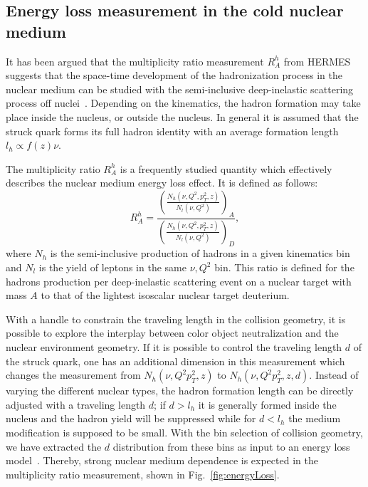 \subsection{Energy loss measurement in the cold nuclear medium}
It has been argued that the multiplicity ratio measurement $R^{h}_{A}$ from
HERMES suggests that the space-time development of the hadronization process in
the nuclear medium can be studied with the semi-inclusive deep-inelastic
scattering process off nuclei~\cite{Airapetian:2003mi,Airapetian:2007vu,Airapetian:2011jp}. Depending on the
kinematics, the hadron formation may take place inside the nucleus, or
outside the nucleus. In general it is assumed that the struck quark forms its
full hadron identity with an average formation length $l_{h}\propto f(z)\nu$.

The multiplicity ratio $R^{h}_{A}$ is a frequently studied quantity
which effectively describes the nuclear medium energy loss effect. It is defined as follows:
\begin{equation}
R^{h}_{A}=\frac{(\frac{N_{h}(\nu,Q^{2},p^{2}_{T},z)}{N_{l}(\nu,Q^{2})})_{A}}{(\frac{N_{h}(\nu,Q^{2},p^{2}_{T},z)}{N_{l}(\nu,Q^{2})})_{D}},
\end{equation}
where $N_{h}$ is the semi-inclusive production of hadrons in a given kinematics
bin and $N_{l}$ is the yield of leptons in the same $\nu,Q^{2}$ bin. This ratio
is defined for the hadrons production per deep-inelastic scattering event on a
nuclear target with mass $A$ to that of the lightest isoscalar nuclear target
deuterium.

With a handle to constrain the traveling length in the
collision geometry, it is possible to explore the interplay between color
object neutralization and the nuclear environment geometry. If it is possible to
control the traveling length $d$ of the struck quark, one has an additional
dimension in this measurement which changes the measurement from
\(N_{h}(\nu,Q^{2}p^{2}_{T},z)\) to \(N_{h}(\nu,Q^{2}p^{2}_{T},z,d) \).
Instead of varying the different nuclear types, the hadron formation length can be
directly adjusted with a traveling length $d$; if $d>l_{h}$ it is generally
formed inside the nucleus and the hadron yield will be suppressed while for
$d<l_{h}$ the medium modification is supposed to be small. With the bin
selection of collision geometry, we have extracted the $d$ distribution from
these bins as input to an energy loss model~\cite{Salgado:2003gb}. Thereby,
strong nuclear medium dependence is expected in the multiplicity ratio
measurement, shown in Fig.~\ref{fig:energyLoss}.

